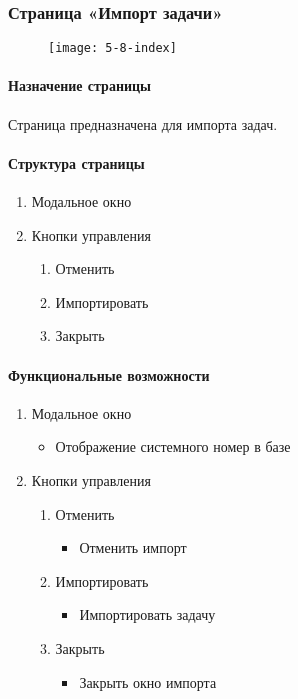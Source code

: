 \subsubsection{Страница «Импорт задачи»}
\begin{figure}[H]
	\texttt{[image: 5-8-index]}
\end{figure}
\paragraph{Назначение страницы}
Страница предназначена для импорта задач.

\paragraph{Структура страницы}
\begin{enumerate}
	\item Модальное окно
	\item Кнопки управления
	\begin{enumerate}
		\item Отменить
		\item Импортировать
		\item Закрыть
	\end{enumerate}
\end{enumerate}

\paragraph{Функциональные возможности}
\begin{enumerate}
	\item Модальное окно
	\begin{itemize}
		\item Отображение системного номер в базе
	\end{itemize}
	\item Кнопки управления
	\begin{enumerate}
		\item Отменить
		\begin{itemize}
			\item Отменить импорт
		\end{itemize}

		\item Импортировать
		\begin{itemize}
			\item Импортировать задачу
		\end{itemize}

		\item Закрыть
		\begin{itemize}
			\item Закрыть окно импорта
		\end{itemize}
	\end{enumerate}
\end{enumerate}


